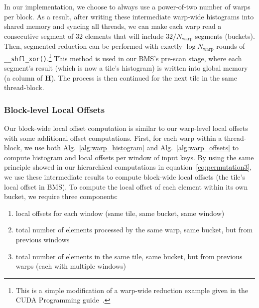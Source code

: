 In our implementation, we choose to always use a power-of-two number of warps per block. As a result, after writing these intermediate warp-wide histograms into shared memory and syncing all threads, we can make each warp read a consecutive segment of 32 elements that will include $32/N_\text{warp}$ segments (buckets). Then, segmented reduction can be performed with exactly $\log N_\text{warp}$ rounds of \texttt{\_\_shfl\_xor()}.\footnote{This is a simple modification of a warp-wide reduction example given in the CUDA Programming guide~\cite[Chapter~B14]{NVIDIA:2016:CUDA}.} 
This method is used in our BMS's pre-scan stage, where each segment's result (which is now a tile's histogram) is written into global memory (a column of $\mathbf{H}$). The process is then continued for the next tile in the same thread-block.

\subsubsection{Block-level Local Offsets}\label{subsubsec:block_offset}
Our block-wide local offset computation is similar to our warp-level local offsets with some additional offset computations.
First, for each warp within a thread-block, we use both  Alg.~\ref{alg:warp_histogram} and Alg.~\ref{alg:warp_offsets} to compute histogram and local offsets per window of input keys. By using the same principle showed in our hierarchical computations in equation~\ref{eq:permutation3}, we use these intermediate results to compute block-wide local offsets (the tile's local offset in BMS). To compute the local offset of each element within its own bucket, we require three components:

\begin{enumerate}
        \item local offsets for each window (same tile, same bucket, same window)
        \item total number of elements processed by the same warp, same bucket, but from previous windows
        \item total number of elements in the same tile, same bucket, but from previous warps (each with multiple windows)
\end{enumerate}

